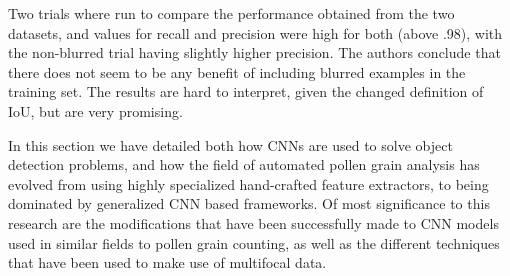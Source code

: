 Two trials where run to compare the performance obtained from the two datasets, and values for recall and precision were high for both (above .98), with the non-blurred trial having slightly higher precision.
The authors conclude that there does not seem to be any benefit of including blurred examples in the training set.
The results are hard to interpret, given the changed definition of IoU, but are very promising.

In this section we have detailed both how CNNs are used to solve object detection problems, and how the field of automated pollen grain analysis has evolved from using highly specialized hand-crafted feature extractors, to being dominated by generalized CNN based frameworks.
Of most significance to this research are the modifications that have been successfully made to CNN models used in similar fields to pollen grain counting, as well as the different techniques that have been used to make use of multifocal data.
